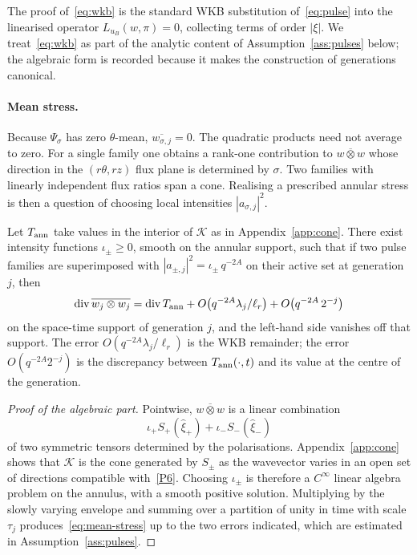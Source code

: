 The proof of~\eqref{eq:wkb} is the standard WKB substitution of~\eqref{eq:pulse} into the linearised operator $L_{u_B}(w,\pi)=0$, collecting terms of order $|\xi|$. We treat~\eqref{eq:wkb} as part of the analytic content of Assumption~\ref{ass:pulses} below; the algebraic form is recorded because it makes the construction of generations canonical.

\paragraph{Mean stress.}
Because $\Psi_\sigma$ has zero $\theta$-mean, $\overline{w_{\sigma,j}}=0$. The quadratic products need not average to zero. For a single family one obtains a rank-one contribution to $\overline{w\otimes w}$ whose direction in the $(r\theta, rz)$ flux plane is determined by $\sigma$. Two families with linearly independent flux ratios span a cone. Realising a prescribed annular stress is then a question of choosing local intensities $|a_{\sigma,j}|^2$.

\begin{proposition}
\label{prop:mean-stress}
Let $T_{\mathrm{ann}}$ take values in the interior of $\mathcal K$ as in Appendix~\ref{app:cone}. There exist intensity functions $\iota_{\pm}\ge 0$, smooth on the annular support, such that if two pulse families are superimposed with $|a_{\pm,j}|^2=\iota_{\pm}\,q^{-2A}$ on their active set at generation $j$, then
\begin{equation}
\label{eq:mean-stress}
\operatorname{div}\overline{w_j\otimes w_j}
=\operatorname{div} T_{\mathrm{ann}}
+O\bigl(q^{-2A}\lambda_j/\ell_r\bigr)
+O\bigl(q^{-2A}\,2^{-j}\bigr)
\end{equation}
on the space-time support of generation $j$, and the left-hand side vanishes off that support. The error $O(q^{-2A}\lambda_j/\ell_r)$ is the WKB remainder; the error $O(q^{-2A}2^{-j})$ is the discrepancy between $T_{\mathrm{ann}}(\cdot,t)$ and its value at the centre of the generation.
\end{proposition}

\begin{proof}[Proof of the algebraic part]
Pointwise, $\overline{w\otimes w}$ is a linear combination
\[
\iota_+ S_+(\hat\xi_+)+\iota_- S_-(\hat\xi_-)
\]
of two symmetric tensors determined by the polarisations. Appendix~\ref{app:cone} shows that $\mathcal K$ is the cone generated by $S_\pm$ as the wavevector varies in an open set of directions compatible with~\ref{P6}. Choosing $\iota_\pm$ is therefore a $C^\infty$ linear algebra problem on the annulus, with a smooth positive solution. Multiplying by the slowly varying envelope and summing over a partition of unity in time with scale $\tau_j$ produces~\eqref{eq:mean-stress} up to the two errors indicated, which are estimated in Assumption~\ref{ass:pulses}.
\end{proof}

